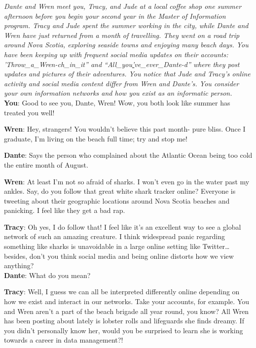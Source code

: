 \documentclass[
  letterpaper,
  DIV=11,
  numbers=noendperiod]{scrreprt}
\begin{document}
\emph{Dante and Wren meet you, Tracy, and Jude at a local coffee shop
one summer afternoon before you begin your second year in the Master of
Information program. Tracy and Jude spent the summer working in the
city, while Dante and Wren have just returned from a month of
travelling. They went on a road trip around Nova Scotia, exploring
seaside towns and enjoying many beach days. You have been keeping up
with frequent social media updates on their accounts:
'Throw\_a\_Wren-ch\_in\_it'' and ``All\_you\ul{'}ve\_ever\_Dante-d''
where they post updates and pictures of their adventures. You notice
that Jude and Tracy's online activity and social media content differ
from Wren and Dante's. You consider your own information networks and
how you exist as an informatic person.}\\

\textbf{You}: Good to see you, Dante, Wren! Wow, you both look like
summer has treated you well!

\textbf{Wren}: Hey, strangers! You wouldn't believe this past month-
pure bliss. Once I graduate, I'm living on the beach full time; try and
stop me!

\textbf{Dante}: Says the person who complained about the Atlantic Ocean
being too cold the entire month of August.

\textbf{Wren}: At least I'm not so afraid of sharks. I won't even go in
the water past my ankles. Say, do you follow that great white shark
tracker online? Everyone is tweeting about their geographic locations
around Nova Scotia beaches and panicking. I feel like they get a bad
rap.

\textbf{Tracy}: Oh yes, I do follow that! I feel like it's an excellent
way to see a global network of such an amazing creature. I think
widespread panic regarding something like sharks is unavoidable in a
large online setting like Twitter\ldots{} besides, don't you think
social media and being online distorts how we view anything?\\

\textbf{Dante}: What do you mean?

\textbf{Tracy}: Well, I guess we can all be interpreted differently
online depending on how we exist and interact in our networks. Take your
accounts, for example. You and Wren aren't a part of the beach brigade
all year round, you know? All Wren has been posting about lately is
lobster rolls and lifeguards she finds dreamy. If you didn't personally
know her, would you be surprised to learn she is working towards a
career in data management?!
\end{document}
